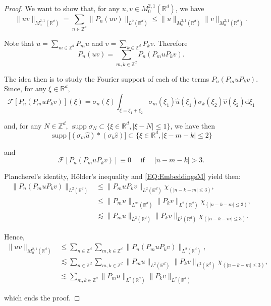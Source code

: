 \documentclass[letterpaper, 11pt,  reqno]{amsart}
\DeclareMathOperator*{\supp}{supp}
\newcommand{\1}{\hspace{0.5mm}\text{I}\hspace{0.5mm}}
\newcommand{\noi}{\noindent}
\newcommand{\Z}{\mathbb{Z}}
\newcommand{\R}{\mathbb{R}}
\newcommand{\F}{\mathcal{F}}
\newcommand{\s}{\sigma}
\newcommand{\les}{\lesssim}
\numberwithin{equation}{section}
\numberwithin{theorem}{section}
\newcommand{\abs}[1]{\lvert#1\rvert}
\begin{document}
\begin{proof}
We want to show that, for any $u,v \in M^{2,1}_0 (\R^d)$, we have
$$
\| uv \|_{M^{2,1}_0 (\R^d)} = \sum_{n \in \Z^d} \| P_n (uv) \|_{L^2 (\R^d)} \leq \| u \|_{M^{2,1}_0 (\R^d)} \| v \|_{M^{2,1}_0 (\R^d)}.
$$

\noi Note that $u = \sum_{m \in \Z^d} P_m u $ and $v = \sum_{k \in \Z^d} P_k v$. Therefore
$$
P_n (uv) = \sum_{m,k \in \Z^d} P_n (P_m u P_k v ).
$$


\noi The idea then is to study the Fourier support of each of the terms $P_n (P_m u P_k v )$. Since, for any $\xi \in \R^d$,
$$
\F [ P_n (P_m u P_k v ) ] (\xi) = \s_n (\xi) \int_{\xi = \xi_1 + \xi_2} \s_m (\xi_1) \widehat{u}(\xi_1) \s_k (\xi_2) \widehat{v}(\xi_2) \mathrm{d}\xi_1
$$

\noi and, for any $N \in \Z^d$, $\supp \s_N \subset \{ \xi \in \R^d, \abs{\xi - N} \leq 1 \}$, we have then
$$
\supp \big[ (\s_m \widehat{u}) \ast (\s_k \widehat{v}) \big] \subset  \{ \xi \in \R^d, \abs{\xi - m - k} \leq 2 \}
$$

\noi and
$$
\F  [ P_n (P_m u P_k v ) ] \equiv 0 \quad \text{ if } \quad \abs{n - m - k} > 3.
$$

\noi Plancherel's identity, H\"older's inequality and \eqref{EQ:EmbeddingsM} yield then:
\begin{align*}
\|  P_n (P_m u P_k v ) \|_{L^2 ( \R^d)} & \leq \|  P_m u P_k v \|_{L^2(\R^d)} \chi_{(\abs{n- k - m} \leq 3)}, \\
	& \leq \| P_m u \|_{L^\infty (\R^d)} \| P_k v \|_{L^2 ( \R^d) }  \chi_{(\abs{n- k - m} \leq 3)}, \\
	& \les \| P_m u \|_{L^2 (\R^d)} \| P_k v \|_{L^2 ( \R^d) }  \chi_{(\abs{n- k - m} \leq 3)}.
\end{align*}

\noi Hence,
\begin{align*}
\| uv \|_{M^{2,1}_0 (\R^d)} & \leq \sum_{n \in \Z^d} \sum_{m,k \in \Z^d} \|  P_n (P_m u P_k v ) \|_{L^2 ( \R^d)}, \\
	& \les  \sum_{n \in \Z^d} \sum_{m,k \in \Z^d} \| P_m u \|_{L^2 (\R^d)} \| P_k v \|_{L^2 ( \R^d) }  \chi_{(\abs{n- k - m} \leq 3)}, \\
	& \les  \sum_{m,k \in \Z^d} \| P_m u \|_{L^2 (\R^d)} \| P_k v \|_{L^2 ( \R^d) }
\end{align*}

\noi which ends the proof.


\end{proof}
\end{document}
